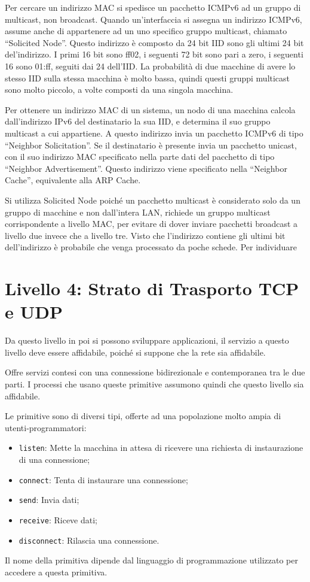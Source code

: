 \documentclass{article}
\numberwithin{equation}{subsection}
\begin{document}
Per cercare un indirizzo MAC si spedisce un pacchetto ICMPv6 ad un gruppo di multicast, non broadcast. Quando un'interfaccia si assegna un indirizzo ICMPv6, 
assume anche di appartenere ad un uno specifico gruppo multicast, chiamato ``Solicited Node''. Questo indirizzo è composto da 24 bit IID sono gli ultimi 
24 bit del'indirizzo. I primi 16 bit sono ff02, i seguenti 72 bit sono pari a zero, i seguenti 16 sono 01:ff, seguiti dai 24 dell'IID. 
La probabilità di due macchine di avere lo stesso IID sulla stessa macchina è molto bassa, quindi questi gruppi multicast sono molto piccolo, a volte composti da una 
singola macchina. 


Per ottenere un indirizzo MAC di un sistema, un nodo di una macchina calcola dall'indirizzo IPv6 del destinatario la sua IID, e determina il suo gruppo multicast a cui 
appartiene. A questo indirizzo invia un pacchetto ICMPv6 di tipo ``Neighbor Solicitation''. Se il destinatario è presente invia un pacchetto unicast, con il suo 
indirizzo MAC specificato nella parte dati del pacchetto di tipo ``Neighbor Advertisement''. 
Questo indirizzo viene specificato nella ``Neighbor Cache'', equivalente alla ARP Cache. 

Si utilizza Solicited Node poiché un pacchetto multicast è considerato solo da un gruppo di macchine e non dall'intera LAN, richiede un gruppo multicast 
corrispondente a livello MAC, per evitare di dover inviare pacchetti broadcast a livello due invece che a livello tre. Visto che l'indirizzo contiene gli ultimi bit 
dell'indirizzo è probabile che venga processato da poche schede. Per individuare 

\clearpage

\section{Livello 4: Strato di Trasporto TCP e UDP}

Da questo livello in poi si possono sviluppare applicazioni, il servizio a questo livello deve essere affidabile, poiché si suppone che la rete sia 
affidabile. 

Offre servizi contesi con una connessione bidirezionale e contemporanea tra le due parti. 
I processi che usano queste primitive assumono quindi che questo livello sia affidabile. 

Le primitive sono di diversi tipi, offerte ad una popolazione molto ampia di utenti-programmatori:
\begin{itemize}
    \item \texttt{listen}: Mette la macchina in attesa di ricevere una richiesta di instaurazione di una connessione;
    \item \texttt{connect}: Tenta di instaurare una connessione;
    \item \texttt{send}: Invia dati;
    \item \texttt{receive}: Riceve dati;
    \item \texttt{disconnect}: Rilascia una connessione. 
\end{itemize}
Il nome della primitiva dipende dal linguaggio di programmazione utilizzato per accedere a questa primitiva. 
\end{document}
